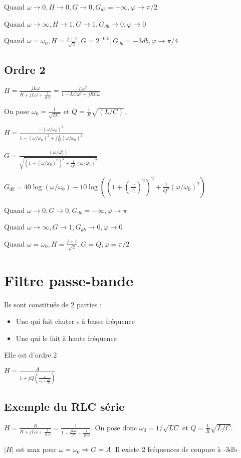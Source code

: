 \documentclass[french]{yLectureNote}
\begin{document}
Quand \(\omega \to 0, H\to 0, G\to 0, G_{db} = -\infty, \varphi \to \pi/2\)

Quand \(\omega \to \infty, H\to 1, G\to 1, G_{db} \to 0, \varphi \to 0\)

Quand \(\omega = \omega_0, H = \frac{j+1}{\sqrt{2}}, G = 2^{-0.5}, G_{db} =-3db, \varphi \to \pi/4\)
\subsection{Ordre 2}
\(H = \frac{jL\omega}{R + jL\omega+\frac{1}{jC\omega}} = \frac{-L\omega^2}{1-LC\omega^2+jRC\omega}\)

On pose \(\omega_0 = \frac{1}{\sqrt{LC}}\) et \(Q = \frac{1}{R}\sqrt{(L/C)}\).

\(H = \frac{-(\omega/\omega_0)^2}{1-(\omega/\omega_0)^2+j\frac{1}{Q}(\omega/\omega_0)^2}\).

\(G = \frac{(\omega/\omega_0^2)}{\sqrt{(1-(\omega/\omega_0)^2)^2+\frac{1}{Q^2}(\omega/\omega_0)^2}}\)

\(G_{db} = 40 \log(\omega/\omega_0) - 10\log((1+(\frac{\omega}{\omega_0})^2)^2 + \frac{1}{Q^2}(\omega/\omega_0)^2)\)


Quand \(\omega \to 0, G\to 0, G_{db} = -\infty, \varphi \to \pi\)

Quand \(\omega \to \infty, G\to 1, G_{db} \to 0, \varphi \to 0\)

Quand \(\omega = \omega_0, H = \frac{j+1}{\sqrt{2}}, G = Q, \varphi = \pi/2\)
\section{Filtre passe-bande}
Ils sont constitués de 2 parties :
\begin{itemize}
 \item Une qui fait chuter s à basse fréquence
 \item Une qui le fait à haute fréquence
\end{itemize}
Elle est d'ordre 2

\(H = \frac{A}{1+jQ(\frac{\omega}{\omega_0 - \frac{\omega_0}{\omega}})}\)
\subsection{Exemple du RLC série}
\(H = \frac{R}{R+jL\omega + \frac{1}{jL\omega}} = \frac{1}{1+\frac{jL\omega}{R}+\frac{1}{jR\omega}}\). On pose donc \(\omega_0 = 1/\sqrt{LC}\) et \(Q = \frac{1}{R}\sqrt{L/C}\).

\(|H|\) est max pour \(\omega = \omega_0 \Rightarrow G = A\). Il existe 2 fréquences de coupure à -3db
\end{document}
